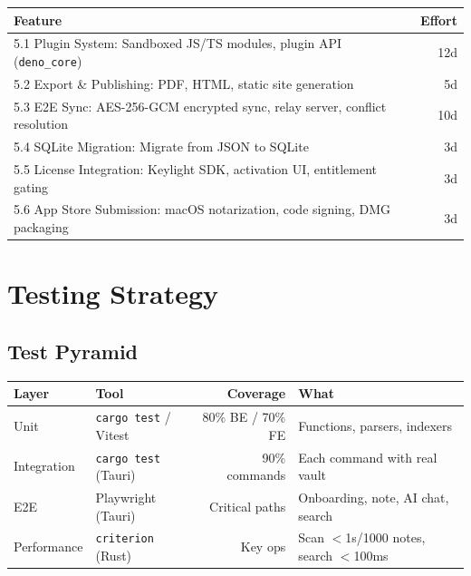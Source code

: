 \documentclass[11pt,a4paper]{article}
\begin{document}
\begin{table}[h]\centering\small
\begin{tabularx}{\textwidth}{Xr}
\toprule
\textbf{Feature} & \textbf{Effort} \\
\midrule
5.1 Plugin System: Sandboxed JS/TS modules, plugin API (\texttt{deno\_core}) & 12d \\
5.2 Export \& Publishing: PDF, HTML, static site generation & 5d \\
5.3 E2E Sync: AES-256-GCM encrypted sync, relay server, conflict resolution & 10d \\
5.4 SQLite Migration: Migrate from JSON to SQLite & 3d \\
5.5 License Integration: Keylight SDK, activation UI, entitlement gating & 3d \\
5.6 App Store Submission: macOS notarization, code signing, DMG packaging & 3d \\
\bottomrule
\end{tabularx}
\end{table}

\section{Testing Strategy}

\subsection{Test Pyramid}

\begin{table}[h]\centering\small
\begin{tabularx}{\textwidth}{XXrX}
\toprule
\textbf{Layer} & \textbf{Tool} & \textbf{Coverage} & \textbf{What} \\
\midrule
Unit & \texttt{cargo test} / Vitest & 80\% BE / 70\% FE & Functions, parsers, indexers \\
Integration & \texttt{cargo test} (Tauri) & 90\% commands & Each command with real vault \\
E2E & Playwright (Tauri) & Critical paths & Onboarding, note, AI chat, search \\
Performance & \texttt{criterion} (Rust) & Key ops & Scan $<$1s/1000 notes, search $<$100ms \\
\bottomrule
\end{tabularx}
\end{table}
\end{document}
